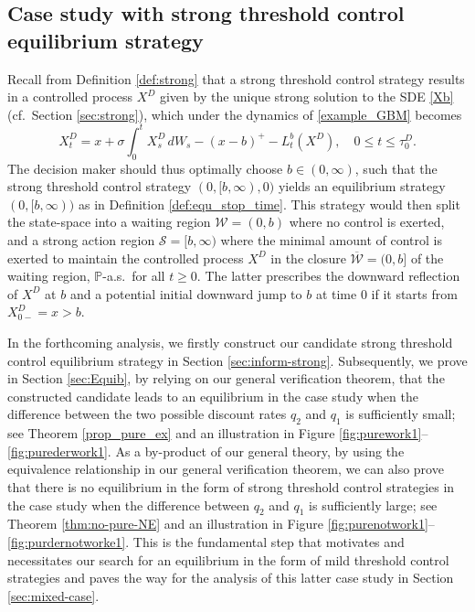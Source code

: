\documentclass[11pt]{article} %
\numberwithin{komcounter}{section}
\begin{document}
\subsection{Case study with strong threshold control equilibrium strategy} 
\label{sec:app-pure}

Recall from Definition \ref{def:strong} that a strong threshold control strategy results in a controlled process $X^D$ given by the unique strong solution to the SDE \eqref{Xb} (cf.~Section \ref{sec:strong}), which under the dynamics of \eqref{example_GBM} becomes 
$$
X_t^{D} = x + \sigma \int_0^t X_s^{D} \, dW_s - (x-b)^+ - L^b_t(X^{D}), 
\quad  0 \leq t \leq \tau^D_0.
$$
The decision maker should thus optimally choose $b \in (0,\infty)$, such that the strong threshold control strategy $(0,[b,\infty), 0)$ yields an equilibrium strategy $(0,[b,\infty))$ as in Definition \ref{def:equ_stop_time}. This strategy would then split the state-space into a waiting region $\mathcal{W}=(0,b)$ where no control is exerted, and a strong action region $\mathcal{S}=[b,\infty)$ where the minimal amount of control is exerted to maintain the controlled process $X^D$ in the closure $\overline{\mathcal{W}}=(0,b]$ of the waiting region, $\mathbb{P}$-a.s.~for all $t \geq 0$. 
The latter prescribes the downward reflection of $X^D$ at $b$ and a potential initial downward jump to $b$ at time $0$ if it starts from $X^D_{0-} = x > b$. 

In the forthcoming analysis, we firstly construct our candidate strong threshold control equilibrium strategy in Section \ref{sec:inform-strong}. 
Subsequently, we prove in Section \ref{sec:Equib}, by relying on our general verification theorem, that the constructed candidate leads to an equilibrium in the case study when the difference between the two possible discount rates $q_2$ and $q_1$ is sufficiently small; see Theorem \ref{prop_pure_ex} and an illustration in Figure \ref{fig:purework1}--\ref{fig:purederwork1}. 
As a by-product of our general theory, by using the equivalence relationship in our general verification theorem, we can also prove that there is no equilibrium in the form of strong threshold control strategies in the case study when the difference between $q_2$ and $q_1$ is sufficiently large; see Theorem \ref{thm:no-pure-NE} and an illustration in Figure \ref{fig:purenotwork1}--\ref{fig:purdernotworke1}. This is the fundamental step that motivates and necessitates our search for an equilibrium in the form of mild threshold control strategies and paves the way for the analysis of this latter case study in Section \ref{sec:mixed-case}. 
\end{document}
